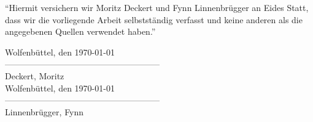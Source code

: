
\noindent"`Hiermit versichern wir Moritz Deckert und Fynn Linnenbrügger an Eides Statt, dass wir die vorliegende Arbeit selbstständig verfasst und keine anderen als die angegebenen Quellen verwendet haben."'
\vspace{8mm}\\
\begin{flushright}
	Wolfenbüttel, den \today
	\vspace{8mm}\\
	------------------------------------------------------\\
	Deckert, Moritz\\
	\vspace{8mm}
	Wolfenbüttel, den \today
	\vspace{8mm}\\
	------------------------------------------------------\\
	Linnenbrügger, Fynn\\
\end{flushright}
\vspace{8mm}

